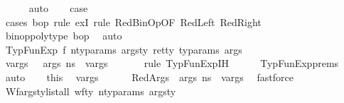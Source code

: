 \begin{isabellebody}
\ \ \ \ \isamarkupfalse%
\ auto\isanewline
\ \ \isamarkupfalse%
\ {\isacharquery}{\kern0pt}case\isanewline
\ \ \ \ \isamarkupfalse%
\ {\isacharparenleft}{\kern0pt}cases\ bop{\isacharsemicolon}{\kern0pt}\ rule\ exI{\isacharsemicolon}{\kern0pt}\ rule\ RedBinOp{\isacharbrackleft}{\kern0pt}OF\ RedLeft\ RedRight{\isacharbrackright}{\kern0pt}{\isacharparenright}{\kern0pt}\isanewline
\ \ \ \ \isamarkupfalse%
\ {\isacartoucheopen}binop{\isacharunderscore}{\kern0pt}poly{\isacharunderscore}{\kern0pt}type\ bop{\isacartoucheclose}\ \isamarkupfalse%
\ auto\isanewline
\isanewline
{}\isamarkupfalse%
\isanewline
\ \ \isamarkupfalse%
\ {\isacharparenleft}{\kern0pt}TypFunExp\ f\ n{\isacharunderscore}{\kern0pt}ty{\isacharunderscore}{\kern0pt}params\ args{\isacharunderscore}{\kern0pt}ty\ ret{\isacharunderscore}{\kern0pt}ty\ ty{\isacharunderscore}{\kern0pt}params\ args\ {\isasymDelta}{\isacharparenright}{\kern0pt}\isanewline
\ \ \isamarkupfalse%
\ {\isachardoublequoteopen}{\isasymexists}vargs{\isachardot}{\kern0pt}\ {\isasymLambda}{\isacharcomma}{\kern0pt}{\isasymGamma}{\isacharcomma}{\kern0pt}{\isasymOmega}\ {\isasymturnstile}\ {\isasymlangle}args{\isacharcomma}{\kern0pt}\ n{\isacharunderscore}{\kern0pt}s{\isasymrangle}\ {\isacharbrackleft}{\kern0pt}{\isasymDown}{\isacharbrackright}{\kern0pt}\ vargs{\isachardoublequoteclose}\ \isanewline
\ \ \ \ \isamarkupfalse%
\ {\isacharparenleft}{\kern0pt}rule\ TypFunExp{\isachardot}{\kern0pt}IH{\isacharparenright}{\kern0pt}\isanewline
\ \ \ \ \isamarkupfalse%
\ TypFunExp{\isachardot}{\kern0pt}prems\ \isamarkupfalse%
\ auto\isanewline
\ \ \isamarkupfalse%
\ this\ \isamarkupfalse%
\ vargs\ \isanewline
\ \ \ \ \ RedArgs{\isacharcolon}{\kern0pt}{\isachardoublequoteopen}{\isasymLambda}{\isacharcomma}{\kern0pt}{\isasymGamma}{\isacharcomma}{\kern0pt}{\isasymOmega}\ {\isasymturnstile}\ {\isasymlangle}args{\isacharcomma}{\kern0pt}\ n{\isacharunderscore}{\kern0pt}s{\isasymrangle}\ {\isacharbrackleft}{\kern0pt}{\isasymDown}{\isacharbrackright}{\kern0pt}\ vargs{\isachardoublequoteclose}\ \isamarkupfalse%
\ fastforce\isanewline
\ \ \isamarkupfalse%
\ Wf{\isacharunderscore}{\kern0pt}args{\isacharunderscore}{\kern0pt}ty{\isacharcolon}{\kern0pt}{\isachardoublequoteopen}list{\isacharunderscore}{\kern0pt}all\ {\isacharparenleft}{\kern0pt}wf{\isacharunderscore}{\kern0pt}ty\ n{\isacharunderscore}{\kern0pt}ty{\isacharunderscore}{\kern0pt}params{\isacharparenright}{\kern0pt}\ args{\isacharunderscore}{\kern0pt}ty{\isachardoublequoteclose}\ \isamarkupfalse%

\end{isabellebody}
